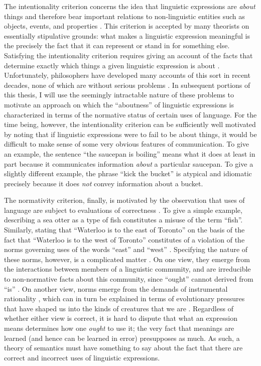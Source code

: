 The intentionality criterion concerns the idea that linguistic expressions are \textit{about} things and therefore bear important relations to non-linguistic entities such as objects, events, and properties \citep{Speaks:2014,Stanley:2008}. This criterion is accepted by many theorists on essentially stipulative grounds: what makes a linguistic expression meaningful is the precisely the fact that it can represent or stand in for something else. Satisfying the intentionality criterion requires giving an account of the facts that determine exactly which things a given linguistic expression is about \citep{Horwich:1998,Brandom:2000}. Unfortunately, philosophers have developed many accounts of this sort in recent decades, none of which are without serious problems \citep{Horwich:1998,Horwich:2005}. In subsequent portions of this thesis, I will use the seemingly intractable nature of these problems to motivate an approach on which the ``aboutness'' of linguistic expressions is characterized in terms of the normative status of certain uses of language. For the time being, however, the intentionality criterion can be sufficiently well motivated by noting that if linguistic expressions were to fail to be about things, it would be difficult to make sense of some very obvious features of communication. To give an example, the sentence ``the saucepan is boiling'' means what it does at least in part because it communicates information \textit{about} a particular saucepan. To give a slightly different example, the phrase ``kick the bucket'' is atypical and idiomatic precisely because it does \textit{not} convey information about a bucket.
 
The normativity criterion, finally, is motivated by the observation that uses of language are subject to evaluations of correctness \citep{Wittgenstein:1953,Brandom:1994,Brandom:2000,Brandom:2009,Sellars:1953}. To give a simple example, describing a sea otter as a type of fish constitutes a misuse of the term ``fish''. Similarly, stating that ``Waterloo is to the east of Toronto'' on the basis of the fact that ``Waterloo is to the west of Toronto'' constitutes of a violation of the norms governing uses of the words ``east'' and ``west'' \citep[i.e., they are not synonyms; see][p. 98]{Brandom:1994}. Specifying the nature of these norms, however, is a complicated matter \citep{Brandom:1994,Kripke:1982}. On one view, they emerge from the interactions between members of a linguistic community, and are irreducible to non-normative facts about this community, since ``ought'' cannot derived from ``is'' \citep{Brandom:1994}. On another view, norms emerge from the demands of instrumental rationality \citep{Horwich:1998}, which can in turn be explained in terms of evolutionary pressures that have shaped us into the kinds of creatures that we are \citep{Dennett:1987,Dennett:2010}. Regardless of whether either view is correct, it is hard to dispute that what an expression means determines how one \textit{ought} to use it; the very fact that meanings are learned (and hence can be learned in error) presupposes as much. As such, a theory of semantics must have something to say about the fact that there are correct and incorrect uses of linguistic expressions.

